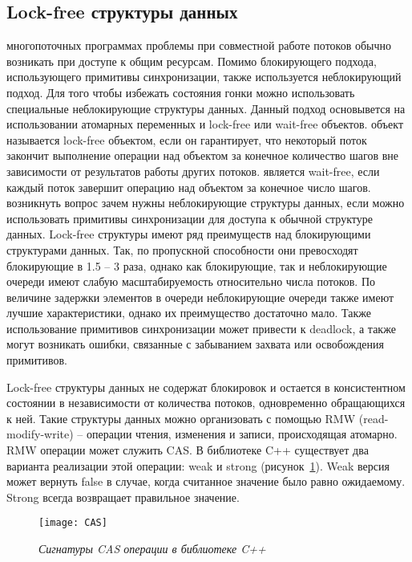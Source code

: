 { %
	\subsection{Lock-free структуры данных}
	\label{lockfree:section}
	 многопоточных программах проблемы при совместной работе потоков обычно возникать при доступе к общим ресурсам. Помимо блокирующего подхода, использующего  примитивы синхронизации, также используется неблокирующий подход. Для того чтобы избежать состояния гонки можно использовать специальные неблокирующие структуры данных. Данный подход основывется на использовании атомарных переменных и lock-free или wait-free объектов.
	 объект называется lock-free объектом, если он гарантирует, что некоторый поток закончит выполнение операции над объектом за конечное количество шагов вне зависимости от результатов работы других потоков.
	 является wait-free, если каждый поток завершит операцию над объектом за конечное число шагов.
	 возникнуть вопрос зачем нужны неблокирующие структуры данных, если можно использовать примитивы синхронизации для доступа к обычной структуре данных. Lock-free структуры имеют ряд преимуществ над блокирующими структурами данных. Так, по пропускной способности они превосходят блокирующие в 1.5 -- 3 раза, однако как блокирующие, так и неблокирующие очереди имеют слабую масштабируемость относительно числа потоков. По величине задержки элементов в очереди неблокирующие очереди также имеют лучшие характеристики, однако их преимущество достаточно мало. Также использование примитивов синхронизации может привести к deadlock, а также могут возникать ошибки, связанные с забыванием захвата или освобождения примитивов.
	\par Lock-free структуры данных не содержат блокировок и остается в консистентном состоянии в независимости от количества потоков, одновременно обращающихся к ней. Такие структуры данных можно организовать с помощью RMW (read-modify-write) -- операции чтения, изменения и записи, происходящая атомарно.
	 RMW операции может служить CAS. В библиотеке C++ существует два варианта реализации этой операции: weak и strong (рисунок~\ref{CAS:image}). Weak версия может вернуть false в случае, когда считанное значение было равно ожидаемому. Strong всегда возвращает правильное значение.
	\begin{figure}[H]
		\texttt{[image: CAS]}
		\caption{\textit{Сигнатуры CAS операции в библиотеке C++}}
		\label{CAS:image}
	\end{figure}
}
